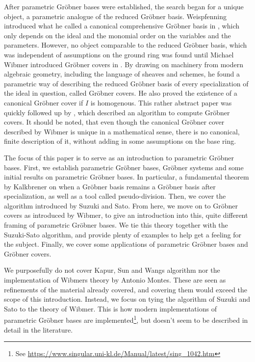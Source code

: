 After parametric Gröbner bases were established, the search began for a unique object, a parametric analogue of the reduced Gröbner basis. Weispfenning introduced what he called a canonical comprehensive Gröbner basis in \cite{WEISPFENNING2003669}, which only depends on the ideal and the monomial order on the variables and the parameters. However, no object comparable to the reduced Gröbner basis, which was independent of assumptions on the ground ring was found until Michael Wibmer introduced Gröbner covers in \cite{grb_covers}. By drawing on machinery from modern algebraic geometry, including the language of sheaves and schemes, he found a parametric way of describing the reduced Gröbner basis of every specialization of the ideal in question, called Gröbner covers. He also proved the existence of a canonical Gröbner cover if $I$ is homogenous. This rather abstract paper was quickly followed up by \cite{MONTES20101391}, which described an algorithm to compute Gröbner covers. It should be noted, that even though the canonical Gröbner cover described by Wibmer is unique in a mathematical sense, there is no canonical, finite description of it, without adding in some assumptions on the base ring.

The focus of this paper is to serve as an introduction to parametric Gröbner bases. First, we establish parametric Gröbner bases, Gröbner systems and some initial results on parametric Gröbner bases. In particular, a fundamental theorem by Kalkbrener\cite{Kalkbrener} on when a Gröbner basis remains a Gröbner basis after specialization, as well as a tool called pseudo-division. Then, we cover the algorithm introduced by Suzuki and Sato. From here, we move on to Gröbner covers as introduced by Wibmer, to give an introduction into this, quite different framing of parametric Gröbner bases. We tie this theory together with the Suzuki-Sato algorithm, and provide plenty of examples to help get a feeling for the subject. Finally, we cover some applications of parametric Gröbner bases and Gröbner covers.

We purposefully do not cover Kapur, Sun and Wangs algorithm nor the implementation of Wibmers theory by Antonio Montes\cite{MONTES20101391}. These are seen as refinements of the material already covered, and covering them would exceed the scope of this introduction. Instead, we focus on tying the algorithm of Suzuki and Sato to the theory of Wibmer. This is how modern implementations of parametric Gröbner bases are implemented\footnote{See \url{https://www.singular.uni-kl.de/Manual/latest/sing_1042.htm}}, but doesn't seem to be described in detail in the literature.

